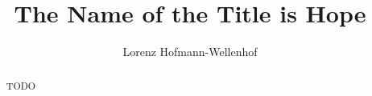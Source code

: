\documentclass[sigconf]{acmart}
\begin{document}
\title{The Name of the Title is Hope}

\author{Lorenz Hofmann-Wellenhof}

\begin{abstract}
  TODO
\end{abstract}



\maketitle










 









\end{document}
